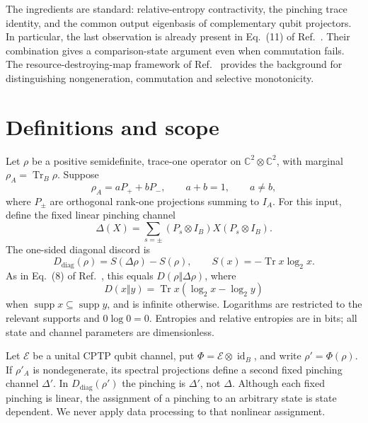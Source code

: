 \documentclass[12pt]{article}
\newcommand{\Tr}{\operatorname{Tr}}
\newcommand{\supp}{\operatorname{supp}}
\newcommand{\id}{\operatorname{id}}
\newcommand{\dd}{D_{\mathrm{diag}}}
\begin{document}
The ingredients are standard: relative-entropy contractivity, the pinching trace identity, and the common output eigenbasis of complementary qubit projectors. In particular, the last observation is already present in Eq.~(11) of Ref.~\cite{Liu2019}. Their combination gives a comparison-state argument even when commutation fails. The resource-destroying-map framework of Ref.~\cite{Liu2017} provides the background for distinguishing nongeneration, commutation and selective monotonicity.

\section{Definitions and scope}
Let $\rho$ be a positive semidefinite, trace-one operator on $\mathbb C^2\otimes\mathbb C^2$, with marginal $\rho_A=\Tr_B\rho$. Suppose
\begin{equation}
 \rho_A=aP_+ +bP_-,\qquad a+b=1,\qquad a\ne b,
 \label{eq:marginal}
\end{equation}
where $P_\pm$ are orthogonal rank-one projections summing to $I_A$. For this input, define the fixed linear pinching channel
\begin{equation}
 \Delta(X)=\sum_{s=\pm}(P_s\otimes I_B)X(P_s\otimes I_B).
 \label{eq:pinching}
\end{equation}
The one-sided diagonal discord is
\begin{equation}
 \dd(\rho)=S(\Delta\rho)-S(\rho),\qquad
 S(x)=-\Tr x\log_2 x.
 \label{eq:discord}
\end{equation}
As in Eq.~(8) of Ref.~\cite{Liu2019}, this equals $D(\rho\Vert\Delta\rho)$, where
\begin{equation}
 D(x\Vert y)=\Tr x(\log_2 x-\log_2 y)
 \label{eq:relative}
\end{equation}
when $\supp x\subseteq\supp y$, and is infinite otherwise. Logarithms are restricted to the relevant supports and $0\log 0=0$. Entropies and relative entropies are in bits; all state and channel parameters are dimensionless.

Let $\mathcal E$ be a unital CPTP qubit channel, put $\Phi=\mathcal E\otimes\id_B$, and write $\rho'=\Phi(\rho)$. If $\rho'_A$ is nondegenerate, its spectral projections define a second fixed pinching channel $\Delta'$. In $\dd(\rho')$ the pinching is $\Delta'$, not $\Delta$. Although each fixed pinching is linear, the assignment of a pinching to an arbitrary state is state dependent. We never apply data processing to that nonlinear assignment.
\end{document}
